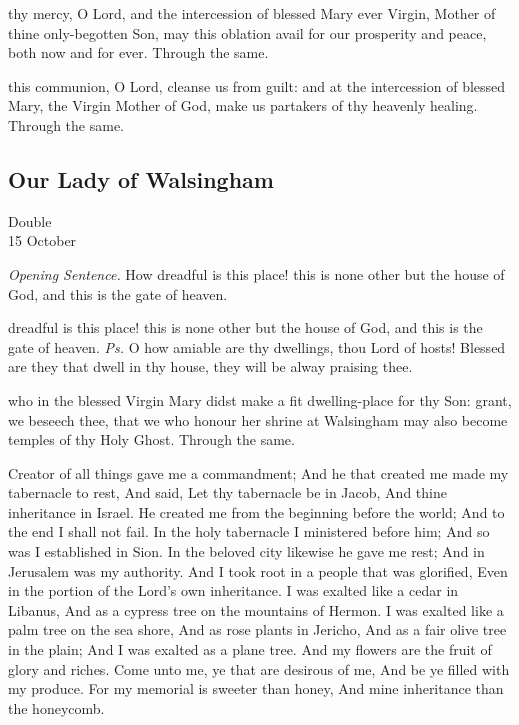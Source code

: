 \secret
{} thy mercy, O Lord, and the intercession of blessed Mary ever Virgin, Mother of thine only-begotten Son, may this oblation avail for our prosperity and peace, both now and for ever. Through the same.

\vspace{-0.25\baselineskip}

\postcommunion
{} this communion, O Lord, cleanse us from guilt: and at the intercession of blessed Mary, the Virgin Mother of God, make us partakers of thy heavenly healing. Through the same.


\subsection{Our Lady of Walsingham}
\begin{inhead}
	{Double\\
		15 October}
\end{inhead}
\par\noindent
\textit{Opening Sentence.} How dreadful is this place! this is none other but the house of God, and this is the gate of heaven.

\vspace{-0.25\baselineskip}

\introit
{} dreadful is this place! this is none other but the house of God, and this is the gate of heaven. \textit{Ps.} O how amiable are thy dwellings, thou Lord of hosts! Blessed are they that dwell in thy house, they will be alway praising thee.

\vspace{-0.25\baselineskip}

\collect
{} who in the blessed Virgin Mary didst make a fit dwelling-place for thy Son: grant, we beseech thee, that we who honour her shrine at Walsingham may also become temples of thy Holy Ghost. Through the same.

 Creator of all things gave me a commandment; And he that created me made my tabernacle to rest, And said, Let thy tabernacle be in Jacob, And thine inheritance in Israel. He created me from the beginning before the world; And to the end I shall not fail. In the holy tabernacle I ministered before him; And so was I established in Sion. In the beloved city likewise he gave me rest; And in Jerusalem was my authority.  And I took root in a people that was glorified, Even in the portion of the Lord's own inheritance. I was exalted like a cedar in Libanus, And as a cypress tree on the mountains of Hermon. I was exalted like a palm tree on the sea shore, And as rose plants in Jericho, And as a fair olive tree in the plain; And I was exalted as a plane tree. And my flowers are the fruit of glory and riches. Come unto me, ye that are desirous of me, And be ye filled with my produce. For my memorial is sweeter than honey, And mine inheritance than the honeycomb.

